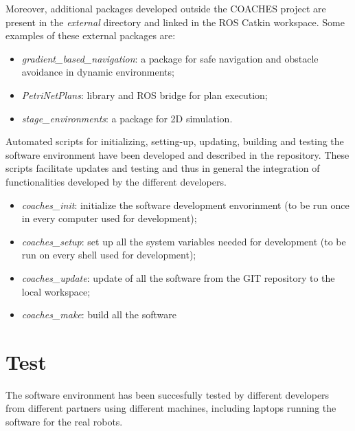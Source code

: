 \documentclass{article}
\begin{document}
Moreover, additional packages developed outside the COACHES project are present in the \emph{external} directory and linked in the ROS Catkin workspace.
Some examples of these external packages are:
\begin{itemize}
\item \emph{gradient\_based\_navigation}: a package for safe navigation and obstacle avoidance in dynamic environments;
\item \emph{PetriNetPlans}: library and ROS bridge for plan execution;
\item \emph{stage\_environments}: a package for 2D simulation.
\end{itemize}

Automated scripts for initializing, setting-up, updating, building and testing the software environment have been developed and described in the repository. These scripts facilitate updates and testing and thus in  general the integration of functionalities developed by the different developers.

\begin{itemize}
\item \emph{coaches\_init}: initialize the software development envorinment (to be run once in every computer used for development);
\item \emph{coaches\_setup}:   set up all the system variables needed for development (to be run on every shell used for development);
\item \emph{coaches\_update}:  update of all the software from the GIT repository to the local workspace;
\item \emph{coaches\_make}:   build all the software
\end{itemize}

\section{Test}

The software environment has been succesfully tested by different developers from different partners using different machines, including laptops running the software for the real robots.
\end{document}
